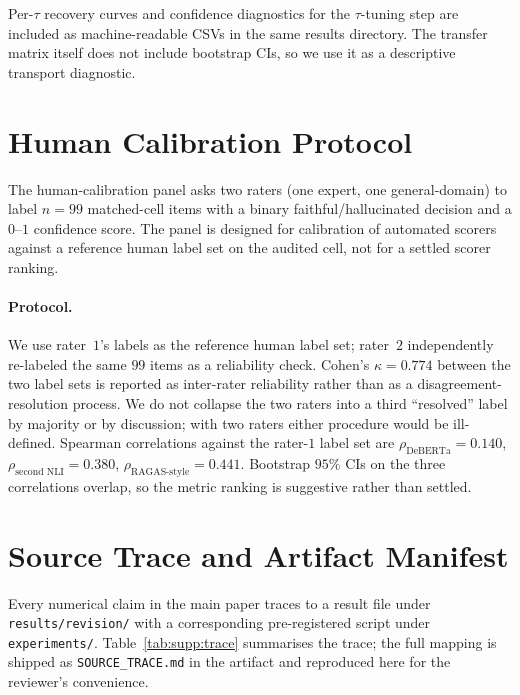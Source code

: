 \documentclass[11pt]{article}
\begin{document}
Per-$\tau$ recovery curves and confidence diagnostics for the
$\tau$-tuning step are included as machine-readable CSVs in the same
results directory. The transfer matrix itself does not include
bootstrap CIs, so we use it as a descriptive transport diagnostic.

\section{Human Calibration Protocol}
\label{supp:human}

The human-calibration panel asks two raters (one expert, one
general-domain) to label $n=99$ matched-cell items with a binary
faithful/hallucinated decision and a $0$--$1$ confidence score. The
panel is designed for calibration of automated scorers against a
reference human label set on the audited cell, not for a settled scorer
ranking.

\paragraph{Protocol.}
We use rater~$1$'s labels as the reference human label set; rater~$2$
independently re-labeled the same $99$ items as a reliability check.
Cohen's $\kappa = 0.774$ between the two label sets is reported as
inter-rater reliability rather than as a disagreement-resolution
process. We do not collapse the two raters into a third
``resolved'' label by majority or by discussion; with two raters
either procedure would be ill-defined. Spearman correlations against
the rater-$1$ label set are
$\rho_{\textrm{DeBERTa}} = 0.140$,
$\rho_{\textrm{second NLI}} = 0.380$,
$\rho_{\textrm{RAGAS-style}} = 0.441$. Bootstrap $95\%$ CIs on the
three correlations overlap, so the metric ranking is suggestive rather
than settled.

\section{Source Trace and Artifact Manifest}
\label{supp:trace}

Every numerical claim in the main paper traces to a result file under
\texttt{results/revision/} with a corresponding pre-registered script
under \texttt{experiments/}. Table~\ref{tab:supp:trace} summarises the
trace; the full mapping is shipped as \texttt{SOURCE\_TRACE.md} in the
artifact and reproduced here for the reviewer's convenience.
\end{document}

